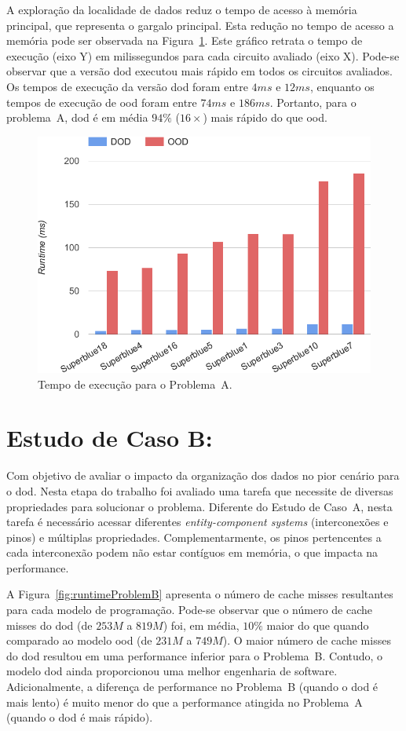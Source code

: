 A exploração da localidade de dados reduz o tempo de acesso à memória principal, que representa o gargalo principal. Esta redução no tempo de acesso a memória pode ser observada na Figura~\ref{fig:runtimeProblemA}. Este gráfico retrata o tempo de execução (eixo Y) em milissegundos para cada circuito avaliado (eixo X). Pode-se observar que a versão \ac{dod} executou mais rápido em todos os circuitos avaliados. Os tempos de execução da versão \ac{dod} foram entre $4ms$ e $12ms$, enquanto os tempos de execução de \ac{ood} foram entre $74ms$ e $186ms$. Portanto, para o problema~A, \ac{dod} é em média $94\%$ ($16\times$) mais rápido do que \ac{ood}.

\begin{figure}[ht]
    \centering
    \includegraphics[width=0.65\linewidth]{img/results/runtimeProblemA}
    \caption[Tempo de execução Problema~A]{Tempo de execução para o Problema~A.}
    \label{fig:runtimeProblemA}
\end{figure}

\section{Estudo de Caso B:}
\label{sec:problema_b}

Com objetivo de avaliar o impacto da organização dos dados no pior cenário para o \ac{dod}. Nesta etapa do trabalho foi avaliado uma tarefa que necessite de diversas propriedades para solucionar o problema.
Diferente do Estudo de Caso~A, nesta tarefa é necessário acessar diferentes \textit{entity-component systems} (interconexões e pinos) e múltiplas propriedades. Complementarmente, os pinos pertencentes a cada interconexão podem não estar contíguos em memória, o que impacta na performance.

A Figura~\ref{fig:runtimeProblemB} apresenta o número de cache misses resultantes para cada modelo de programação. Pode-se observar que o número de cache misses do \ac{dod} (de $253M$ a $819M$) foi, em média, $10\%$ maior do que quando comparado ao modelo \ac{ood} (de $231M$ a $749M$). O maior número de cache misses do \ac{dod} resultou em uma performance inferior para o Problema~B. Contudo, o modelo \ac{dod} ainda proporcionou uma melhor engenharia de software. Adicionalmente, a diferença de performance no Problema~B (quando o \ac{dod} é mais lento) é muito menor do que a performance atingida no Problema~A (quando o \ac{dod} é mais rápido).

